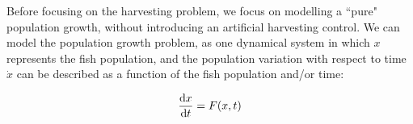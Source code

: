 Before focusing on the harvesting problem, we focus on modelling a  ``pure" population growth, without introducing an artificial harvesting control. We can model the population growth problem, as one dynamical system in which $x$ represents the fish population, and the population variation with respect to time $\dot{x}$ can be  described as a function of the fish population and/or time:

\begin{equation}
\frac{\mathrm{d} x}{{\mathrm{d} t}}=F(x,t)
\end{equation}